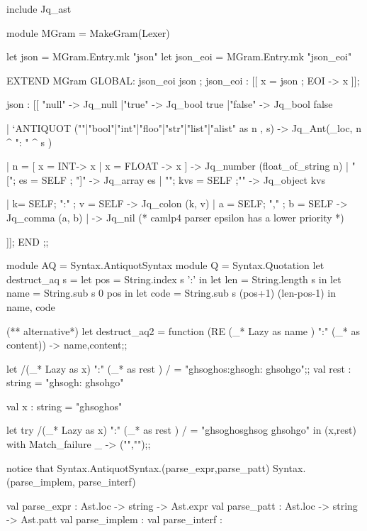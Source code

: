\begin{enumerate}[(a)]
\begin{bluecode}
include Jq_ast 

module MGram = MakeGram(Lexer) 

let json  = MGram.Entry.mk "json"
let json_eoi = MGram.Entry.mk "json_eoi" 


EXTEND  MGram 
  GLOBAL: json_eoi  json ; 
  json_eoi : [[ x = json ; EOI -> x ]]; 

  json : 
    [[ "null" -> Jq_null 
     |"true" -> Jq_bool true 
     |"false" -> Jq_bool false 

     | `ANTIQUOT (""|"bool"|"int"|"floo"|"str"|"list"|"alist" as n , s) -> 
       Jq_Ant(_loc, n ^ ": " ^ s )

     | n = [ x = INT-> x | x =  FLOAT -> x ] -> Jq_number (float_of_string n)
     | "["; es = SELF ; "]" -> Jq_array es 
     | "{";  kvs = SELF ;"}" -> Jq_object kvs 

     | k= SELF; ":" ; v = SELF -> Jq_colon (k, v)
     | a = SELF; "," ; b = SELF -> Jq_comma (a, b)
     | -> Jq_nil  (* camlp4 parser epsilon has a lower priority *)

     ]];
END ;;

module AQ = Syntax.AntiquotSyntax 
module Q = Syntax.Quotation 
let destruct_aq s = 
  let pos = String.index s ':' in 
  let len = String.length s in 
  let name = String.sub s 0 pos in
  let code = String.sub s (pos+1) (len-pos-1) in 
  name, code

(** alternative*)  
let destruct_aq2  = function (RE (_* Lazy as  name ) ":" (_* as content)) -> name,content;;
\end{bluecode}

\begin{alternate}
let /(_* Lazy as x) ":" (_* as rest ) / = "ghsoghos:ghsogh: ghsohgo";;
val rest : string = "ghsogh: ghsohgo"

val x : string = "ghsoghos"  
\end{alternate}

\begin{bluecode}
let try /(_* Lazy as x) ":" (_* as rest ) / = "ghsoghosghsog ghsohgo"
in (x,rest)
with Match_failure _ -> ("","");;  
\end{bluecode}
notice that  Syntax.AntiquotSyntax.(parse\_expr,parse\_patt)
Syntax.(parse\_implem, parse\_interf)

\begin{bluecode}
        val parse_expr : Ast.loc -> string -> Ast.expr
        val parse_patt : Ast.loc -> string -> Ast.patt
    val parse_implem :
    val parse_interf :
\end{bluecode}


\end{enumerate}

